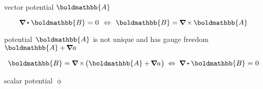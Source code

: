 vector potential $\boldmathbb{A}$

\nopagebreak\[
\boldnabla \dotp \hspace{.12ex} \boldmathbb{B} = \hspace{.1ex} 0
\hspace{.4em} \Leftrightarrow \hspace{.4em}
\boldmathbb{B} =  \hspace{-0.1ex} \boldnabla \hspace{-0.15ex} \times \hspace{-0.12ex} \boldmathbb{A}
\]

potential~${\boldmathbb{A}}$ is not unique and has gauge freedom ${\boldmathbb{A} + \hspace{-0.2ex} \boldnabla a}$

\[
\boldmathbb{B} =  \hspace{-0.1ex} \boldnabla \hspace{-0.15ex} \times \hspace{-0.3ex} \bigl( \boldmathbb{A} + \hspace{-0.2ex} \boldnabla a \hspace{.1ex} \bigr)
\hspace{.25em} \Leftrightarrow \hspace{.27em}
\boldnabla \dotp \hspace{.12ex} \boldmathbb{B} = \hspace{.1ex} 0
\]

scalar potential $\upphi$

